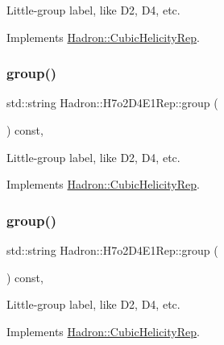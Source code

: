 Little-\/group label, like D2, D4, etc. 

Implements \mbox{\hyperlink{structHadron_1_1CubicHelicityRep_a101a7d76cd8ccdad0f272db44b766113}{Hadron\+::\+Cubic\+Helicity\+Rep}}.

\mbox{\label{structHadron_1_1H7o2D4E1Rep_ad2f4770cf61bbb361907c5347106cf14}} 
\subsubsection{\texorpdfstring{group()}{group()}\hspace{0.1cm}{\footnotesize\ttfamily [3/5]}}
{\footnotesize\ttfamily std\+::string Hadron\+::\+H7o2\+D4\+E1\+Rep\+::group (\begin{DoxyParamCaption}{ }\end{DoxyParamCaption}) const\hspace{0.3cm}{\ttfamily [inline]}, {\ttfamily [virtual]}}

Little-\/group label, like D2, D4, etc. 

Implements \mbox{\hyperlink{structHadron_1_1CubicHelicityRep_a101a7d76cd8ccdad0f272db44b766113}{Hadron\+::\+Cubic\+Helicity\+Rep}}.

\mbox{\label{structHadron_1_1H7o2D4E1Rep_ad2f4770cf61bbb361907c5347106cf14}} 
\subsubsection{\texorpdfstring{group()}{group()}\hspace{0.1cm}{\footnotesize\ttfamily [4/5]}}
{\footnotesize\ttfamily std\+::string Hadron\+::\+H7o2\+D4\+E1\+Rep\+::group (\begin{DoxyParamCaption}{ }\end{DoxyParamCaption}) const\hspace{0.3cm}{\ttfamily [inline]}, {\ttfamily [virtual]}}

Little-\/group label, like D2, D4, etc. 

Implements \mbox{\hyperlink{structHadron_1_1CubicHelicityRep_a101a7d76cd8ccdad0f272db44b766113}{Hadron\+::\+Cubic\+Helicity\+Rep}}.

